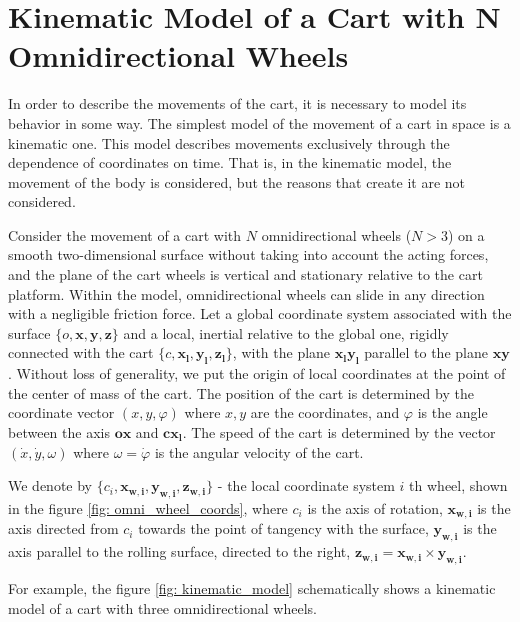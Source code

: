 \documentclass[oneside,final,14pt]{extreport}
\newcommand{\bs}{\boldsymbol}
\begin{document}
\chapter {Kinematic Model of a Cart with N Omnidirectional Wheels}
In order to describe the movements of the cart, it is necessary to model its behavior in some way. The simplest model of the movement of a cart in space is a kinematic one. This model describes movements exclusively through the dependence of coordinates on time. That is, in the kinematic model, the movement of the body is considered, but the reasons that create it are not considered.

Consider the movement of a cart with $ N $ omnidirectional wheels ($ N> 3 $) on a smooth two-dimensional surface without taking into account the acting forces, and the plane of the cart wheels is vertical and stationary relative to the cart platform. Within the model, omnidirectional wheels can slide in any direction with a negligible friction force. Let a global coordinate system associated with the surface $ \{o, \boldsymbol {x}, \bs {y}, \bs {z} \} $ and a local, inertial relative to the global one, rigidly connected with the cart $ \{c, \bs {x_ {l}}, \bs {y_ {l}}, \bs {z_ {l}} \} $, with the plane $ \bs {x_ {l}} \bs {y_ {l}} $ parallel to the plane $ \bs {x} \bs{y} $. Without loss of generality, we put the origin of local coordinates at the point of the center of mass of the cart. The position of the cart is determined by the coordinate vector $ (x, y, \varphi) $
where $ x, y $ are the coordinates, and $ \varphi $ is the angle between the axis $ \bs{ox} $ and $ \bs{cx_{l}} $. The speed of the cart is determined by the vector $ (\dot{x}, \dot{y}, \omega) $ where $ \omega = \dot{\varphi} $ is the angular velocity of the cart.

We denote by $ \{c_{i}, \bs{x_{w, i}}, \bs{y_{w, i}}, \bs{z_{w, i}} \} $ - the local coordinate system $ i $ th wheel, shown in the figure \ref{fig: omni_wheel_coords}, where $ c_{i} $ is the axis of rotation, $ \bs{x_{w, i}} $ is the axis directed from $ c_{i} $ towards the point of tangency with the surface, $ \bs{y_{w, i}} $ is the axis parallel to the rolling surface, directed to the right, $ \bs{z_{w, i}} = \bs{x_{w, i }} \times \bs{y_{w, i}} $.

For example, the figure \ref{fig: kinematic_model} schematically shows a kinematic model of a cart with three omnidirectional wheels.


\begin{figure} [H]
\end{figure}
\end{document}
